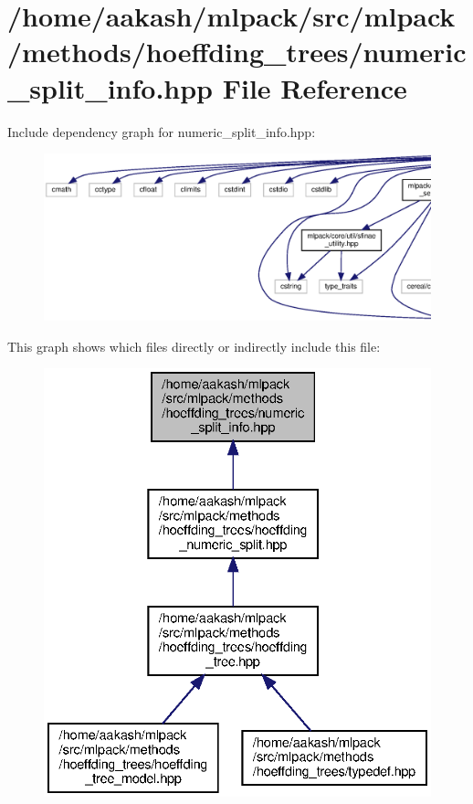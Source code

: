 \section{/home/aakash/mlpack/src/mlpack/methods/hoeffding\+\_\+trees/numeric\+\_\+split\+\_\+info.hpp File Reference}
\label{numeric__split__info_8hpp}
Include dependency graph for numeric\+\_\+split\+\_\+info.\+hpp\+:
\nopagebreak
\begin{figure}[H]
\begin{center}
\leavevmode
\includegraphics[width=350pt]{numeric__split__info_8hpp__incl}
\end{center}
\end{figure}
This graph shows which files directly or indirectly include this file\+:
\nopagebreak
\begin{figure}[H]
\begin{center}
\leavevmode
\includegraphics[width=332pt]{numeric__split__info_8hpp__dep__incl}
\end{center}
\end{figure}
